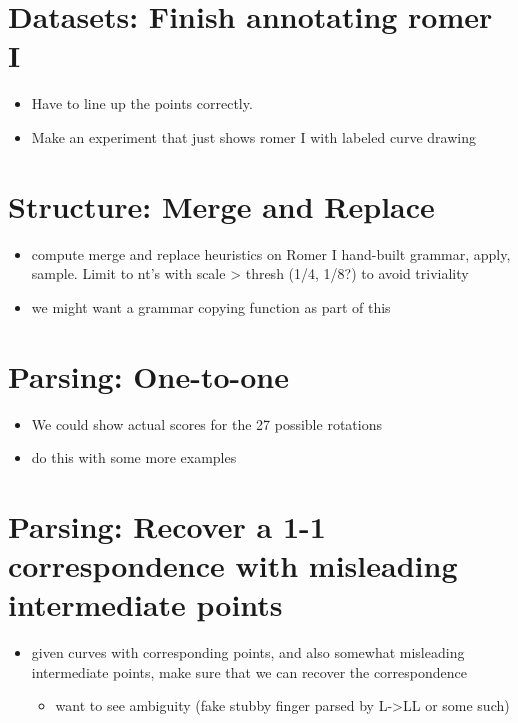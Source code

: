 \documentclass{book}
\begin{document}
\section{Datasets: Finish annotating romer I}
\label{sec-4_4}

\begin{itemize}
\item Have to line up the points correctly.
\item Make an experiment that just shows romer I with labeled curve
    drawing
\end{itemize}
\section{Structure: Merge and Replace}
\label{sec-4_5}


\begin{itemize}
\item compute merge and replace heuristics on Romer I hand-built
    grammar, apply, sample. Limit to nt's with scale > thresh (1/4,
    1/8?) to avoid triviality
\item we might want a grammar copying function as part of this
\end{itemize}
\section{Parsing: One-to-one}
\label{sec-4_6}

\begin{itemize}
\item We could show actual scores for the 27 possible rotations
\item do this with some more examples
\end{itemize}
\section{Parsing: Recover a 1-1 correspondence with misleading intermediate points}
\label{sec-4_7}


\begin{itemize}
\item given curves with corresponding points, and also somewhat
    misleading intermediate points, make sure that we can recover the
    correspondence

\begin{itemize}
\item want to see ambiguity (fake stubby finger parsed by L->LL or some such)
\end{itemize}

\end{itemize}
\end{document}
